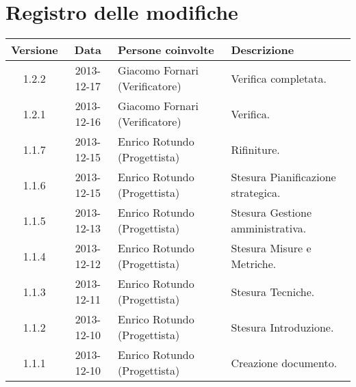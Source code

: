 \section*{Registro delle modifiche}

\small{
\begin{tabularx}{\textwidth}{|c|c|l|X|}
 \hline \textbf{Versione} & \textbf{Data} & \textbf{Persone coinvolte} & \textbf{Descrizione} \\
 
 \hline 1.2.2 & 2013-12-17 & Giacomo Fornari (Verificatore) & Verifica completata. \\
 \hline 1.2.1 & 2013-12-16 & Giacomo Fornari (Verificatore) & Verifica. \\
 \hline 1.1.7 & 2013-12-15 & Enrico Rotundo (Progettista) & Rifiniture. \\
 \hline 1.1.6 & 2013-12-15 & Enrico Rotundo (Progettista) & Stesura Pianificazione strategica. \\
 \hline 1.1.5 & 2013-12-13 & Enrico Rotundo (Progettista) & Stesura Gestione amministrativa. \\
 \hline 1.1.4 & 2013-12-12 & Enrico Rotundo (Progettista) & Stesura Misure e Metriche. \\
 \hline 1.1.3 & 2013-12-11 & Enrico Rotundo (Progettista) & Stesura Tecniche. \\
 \hline 1.1.2 & 2013-12-10 & Enrico Rotundo (Progettista) & Stesura Introduzione. \\
 \hline 1.1.1 & 2013-12-10 & Enrico Rotundo (Progettista) & Creazione documento. \\
 \hline
\end{tabularx}
}
